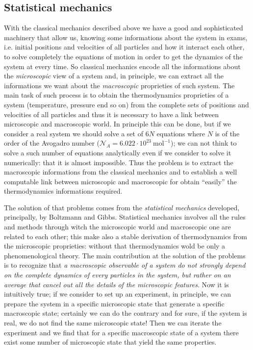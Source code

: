 \subsection{Statistical mechanics}
With the classical mechanics described above we have a good and sophisticated machinery that allow us, knowing some informations about the system in exams, i.e. initial positions and velocities of all particles and how it interact each other, to solve completely the equations of motion in order to get the dynamics of the system at every time. So classical mechanics encode all the informations about the \textit{microscopic} view of a system and, in principle, we can extract all the informations we want about the \textit{macroscopic} proprieties of such system. The main task of such process is to obtain the thermodynamics proprieties of a system (temperature, pressure end so on) from the complete sets of positions and velocities of all particles and thus it is necessary to have a link between microscopic and macroscopic world. In principle this can be done, but if we consider a real system we should solve a set of $6N$ equations where $N$ is of the order of the Avogadro number ($\mathcal{N}_A = 6.022 \cdot 10^{23}~\text{mol}^{-1}$); we can not think to solve a such number of equations analytically even if we consider to solve it numerically: that it is almost impossible. Thus the problem is to extract the macroscopic informations from the classical mechanics and to establish a well computable link between microscopic and macroscopic for obtain ``easily'' the thermodynamics informations required.

The solution of that problems comes from the \textit{statistical mechanics} developed, principally, by Boltzmann and Gibbs. Statistical mechanics involves all the rules and methods through witch the microscopic world and macroscopic one are related to each other; this make also a stable derivation of thermodynamics from the microscopic proprieties: without that thermodynamics wold be only a phenomenological theory. The main contribution at the solution of the problems is to recognize that \textit{a macroscopic observable of a system do not strongly depend on the complete dynamics of every particles in the system, but rather on an \textit{average} that cancel out all the details of the microscopic features}. Now it is intuitively true; if we consider to set up an experiment, in principle, we can prepare the system in a specific microscopic state that generate a specific macroscopic state; certainly we can do the contrary and for sure, if the system is real, we do not find the same microscopic state! Then we can iterate the experiment and we find that for a specific macroscopic state of a system there exist some number of microscopic state that yield the same properties.

